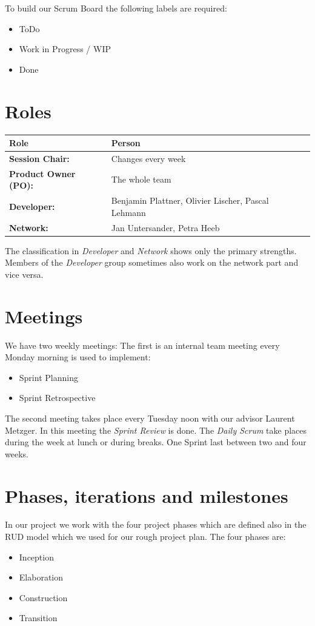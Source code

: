 \noindent To build our Scrum Board the following labels are required:

\begin{itemize}
\item ToDo
\item Work in Progress / WIP
\item Done
\end{itemize}

\section{Roles}
\label{roles}

\begin{tabular}{l|l}
    \textbf{Role} & \textbf{Person}\\
    \hline
    \textbf{Session Chair:} & Changes every week \\
    \textbf{Product Owner (PO):} & The whole team \\
    \textbf{Developer:} & Benjamin Plattner, Olivier Lischer, Pascal Lehmann\\
    \textbf{Network:} & Jan Untersander, Petra Heeb \\
\end{tabular}
\newline
\noindent The classification in \textsl{Developer} and \textsl{Network} shows only the primary strengths.
Members of the \textsl{Developer} group sometimes also work on the network part and vice versa.


\section{Meetings}
\label{meetings}
We have two weekly meetings: \newline
The first is an internal team meeting every Monday morning is used to implement:
\begin{itemize}
  \item Sprint Planning
  \item Sprint Retrospective 
\end{itemize}

\noindent The second meeting takes place every Tuesday noon with our advisor Laurent Metzger.
In this meeting the \textsl{Sprint Review} is done.
\newline
\noindent The \textsl{Daily Scrum} take places during the week at lunch or during breaks.
One Sprint last between two and four weeks.


\section{Phases, iterations and milestones}
\label{phases}
In our project we work with the four project phases which are defined also in the RUD model which we used for our rough project plan. The four phases are:
\begin{itemize}
    \item Inception
    \item Elaboration
    \item Construction
    \item Transition
\end{itemize}

